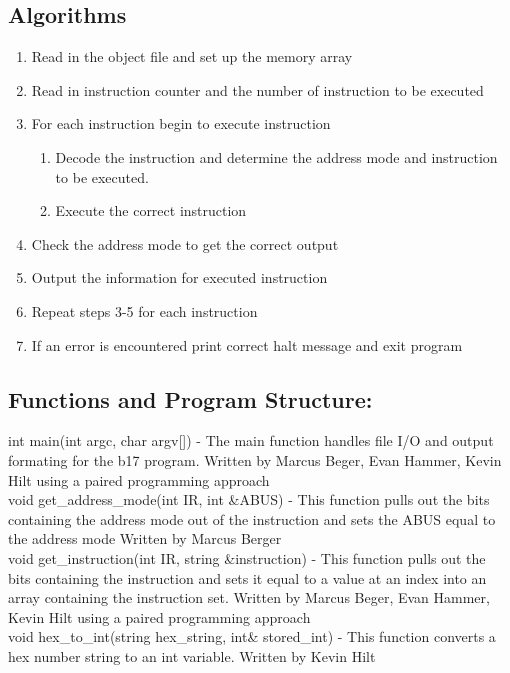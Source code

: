 \documentclass[11pt]{article}
\begin{document}
\subsection{Algorithms}
\begin{enumerate}
\item Read in the object file and set up the memory array
\item Read in instruction counter and the number of instruction to be executed
\item For each instruction  begin to execute instruction
\begin{enumerate}\item Decode the instruction and determine the address mode and instruction to be executed.
\item Execute the correct instruction \end{enumerate}
\item Check the address mode to get the correct output
\item Output the information for executed instruction 
\item Repeat steps 3-5 for each instruction
\item If an error is encountered print correct halt message and exit program
\end{enumerate}

\subsection{Functions and Program Structure:}
int main(int argc, char\* argv[]) - The main function handles file I/O and output formating for the b17 program. Written by Marcus Beger, Evan Hammer, Kevin Hilt using a paired programming approach\\

void get\_address\_mode(int IR, int \&ABUS) - This function pulls out the bits containing the address mode out of the  instruction and sets the ABUS equal to the address mode Written by Marcus Berger\\

void get\_instruction(int IR, string \&instruction) - This function pulls out the bits containing the instruction and sets it equal to a value at an index into an array containing the instruction set. Written by Marcus Beger, Evan Hammer, Kevin Hilt using a paired programming approach\\

void hex\_to\_int(string hex\_string, int\& stored\_int) - This function converts a hex number string to an int variable. Written by Kevin Hilt\\
\end{document}
